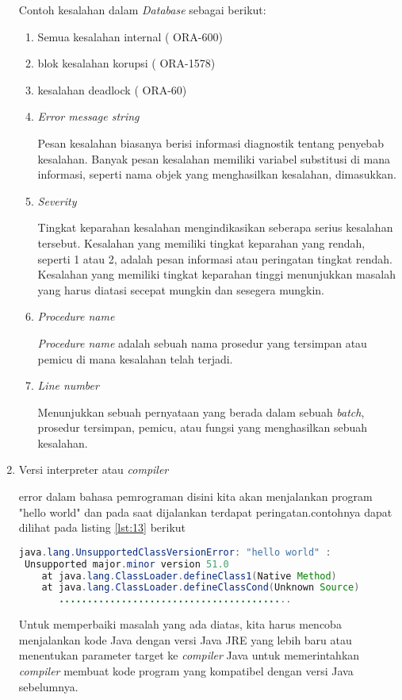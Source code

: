 \begin{enumerate}
\par
Contoh kesalahan dalam \textit{Database} sebagai berikut:
\begin{enumerate}
\item Semua kesalahan internal ( ORA-600)
\item blok kesalahan korupsi ( ORA-1578)
\item kesalahan deadlock ( ORA-60) 
\item \textit{Error message string}
\par 
Pesan kesalahan biasanya berisi informasi diagnostik tentang penyebab kesalahan. Banyak pesan kesalahan memiliki variabel substitusi di mana informasi, seperti nama objek yang menghasilkan kesalahan, dimasukkan.
\item \textit{Severity}
\par 
Tingkat keparahan kesalahan mengindikasikan seberapa serius kesalahan tersebut. Kesalahan yang memiliki tingkat keparahan yang rendah, seperti 1 atau 2, adalah pesan informasi atau peringatan tingkat rendah. Kesalahan yang memiliki tingkat keparahan tinggi menunjukkan masalah yang harus diatasi secepat mungkin dan sesegera mungkin.
\item \textit{Procedure name}
\par 
\textit{Procedure name} adalah sebuah nama prosedur yang tersimpan atau pemicu di mana kesalahan telah terjadi.
\item \textit{Line number}
\par 
Menunjukkan sebuah pernyataan yang berada dalam sebuah \textit{batch}, prosedur tersimpan, pemicu, atau fungsi yang menghasilkan sebuah kesalahan.
\end{enumerate}
\item Versi interpreter atau \textit{compiler}
\par 
error dalam bahasa pemrograman disini kita akan menjalankan program "hello world" dan pada saat dijalankan terdapat peringatan.contohnya dapat dilihat pada listing \ref{lst:13} berikut

\begin{lstlisting}[language=Java, caption=Contoh warning error,label={lst:13}]
java.lang.UnsupportedClassVersionError: "hello world" :
 Unsupported major.minor version 51.0
    at java.lang.ClassLoader.defineClass1(Native Method)
    at java.lang.ClassLoader.defineClassCond(Unknown Source)
       .........................................
\end{lstlisting}
Untuk memperbaiki masalah yang ada diatas, kita harus mencoba menjalankan kode Java dengan versi Java JRE yang lebih baru atau menentukan parameter target ke \textit{compiler} Java untuk memerintahkan \textit{compiler} membuat kode program yang kompatibel dengan versi Java sebelumnya.
\end{enumerate}